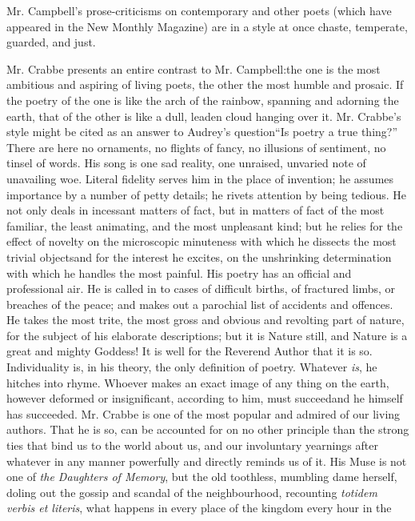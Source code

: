 Mr. Campbell's prose-criticisms on contemporary and other poets (which
have appeared in the New Monthly Magazine) are in a style at once
chaste, temperate, guarded, and just.

Mr. Crabbe presents an entire contrast to
Mr. Campbell:\textemdash the one is the most ambitious and aspiring of living
poets, the other the most humble and prosaic. If the poetry of the one
is like the arch of the rainbow, spanning and adorning the earth, that
of the other is like a dull, leaden cloud hanging over it. Mr. Crabbe's
style might be cited as an answer to Audrey's question\textemdash ``Is poetry
a true thing?'' There are here no ornaments, no flights of fancy, no
illusions of sentiment, no tinsel of words. His song is one sad reality,
one unraised, unvaried note of unavailing woe. Literal fidelity serves
him in the place of invention; he assumes importance by a number of
petty details; he rivets attention by being tedious. He not only deals
in incessant matters of fact, but in matters of fact of the most
familiar, the least animating, and the most unpleasant kind; but he
relies for the effect of novelty on the microscopic minuteness with
which he dissects the most trivial objects\textemdash and for the interest he
excites, on the unshrinking determination with which he handles the most
painful. His poetry has an official and professional air. He is called
in to cases of difficult births, of fractured limbs, or breaches of the
peace; and makes out a parochial list of accidents and offences. He
takes the most trite, the most gross and obvious and revolting part of
nature, for the subject of his elaborate descriptions; but it is Nature
still, and Nature is a great and mighty Goddess! It is well for the
Reverend Author that it is so. Individuality is, in his theory, the only
definition of poetry. Whatever \emph{is}, he hitches into rhyme. Whoever
makes an exact image of any thing on the earth, however deformed or
insignificant, according to him, must succeed\textemdash and he himself has
succeeded. Mr. Crabbe is one of the most popular and admired of our
living authors. That he is so, can be accounted for on no other
principle than the strong ties that bind us to the world about us, and
our involuntary yearnings after whatever in any manner powerfully and
directly reminds us of it. His Muse is not one of \emph{the Daughters of
Memory}, but the old toothless, mumbling dame herself, doling out the
gossip and scandal of the neighbourhood, recounting \emph{totidem verbis et
literis}, what happens in every place of the kingdom every hour in the
